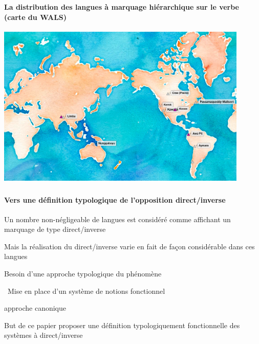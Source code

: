 \begin{frame}
\frametitle{}
\framesubtitle{La distribution des langues à marquage hiérarchique
  sur le verbe (carte du WALS)}
\begin{center}
\vspace*{-.3cm}
\includegraphics[width=120mm]{hierarchy-marking}

\end{center}
\end{frame}

\begin{frame}
\frametitle{}
\framesubtitle{Vers une définition typologique de l'opposition direct/inverse}
\begin{wideitemize}
\item Un nombre non-négligeable de langues est considéré comme affichant un marquage de
  type direct/inverse
\item Mais la réalisation du direct/inverse varie en fait de façon
  considérable dans ces langues\\ 
\item[\highlighti{\lefthand}] Besoin d'une approche typologique du phénomène
\end{wideitemize}
\begin{wideitemize}
\item[\highlightiv{\lefthand}]~Mise en place d'un système de notions fonctionnel
\item[\highlightiv{\lefthand}] approche canonique
\end{wideitemize}
\begin{wideitemize}
\item[\highlightii{\lefthand}] But de ce papier {\ra} proposer une définition typologiquement
  fonctionnelle des systèmes à direct/inverse
\end{wideitemize}
\end{frame}